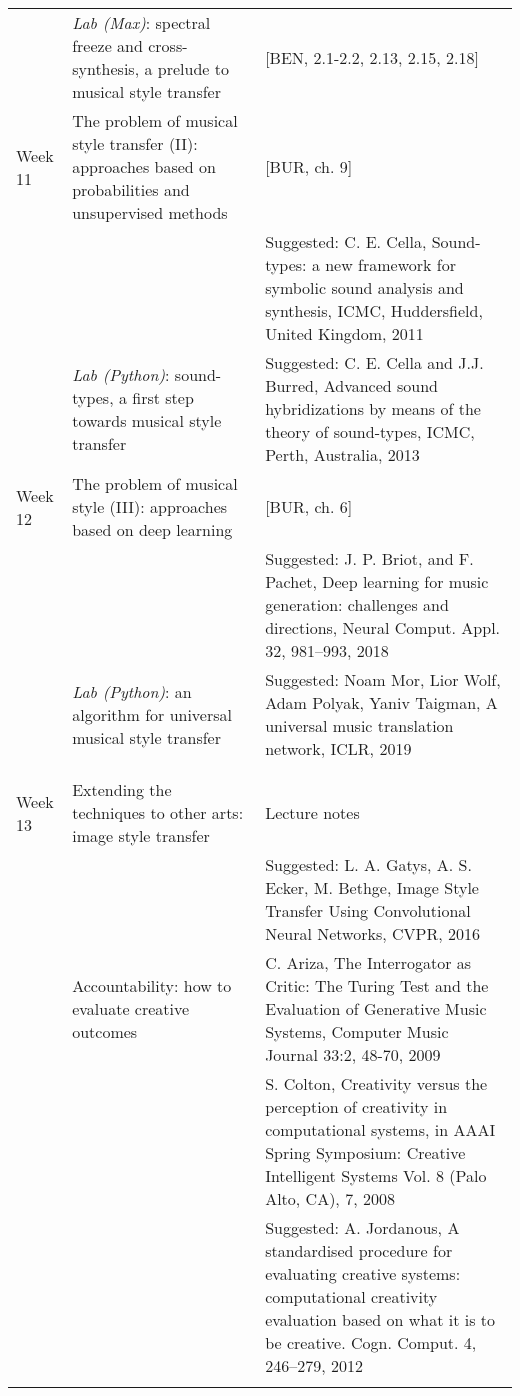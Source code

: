 \documentclass[letterpaper]{inzane_syllabus} %
\begin{document}
\begin{center}
\begin{tabularx}{\textwidth}{p{2cm}p{8cm} @{\hskip 0.5cm} p{9.5cm}}
&   \emph{Lab (Max)}: spectral freeze and cross-synthesis, a prelude to musical style transfer & [BEN, 2.1-2.2, 2.13, 2.15, 2.18] \\
\arrayrulecolor{maingray}\hline

Week 11 & The problem of musical style transfer (II): approaches based on probabilities and unsupervised methods & [BUR, ch. 9] \\

& & Suggested: C. E. Cella, Sound-types: a new framework for symbolic sound analysis and synthesis, ICMC, Huddersfield, United Kingdom, 2011 \\

&\emph{Lab (Python)}: sound-types, a first step towards musical style transfer & Suggested: C. E. Cella and J.J. Burred, Advanced sound hybridizations by means of the theory of sound-types, ICMC, Perth, Australia, 2013 \\

\arrayrulecolor{maingray}\hline
Week 12 & The problem of musical style (III): approaches based on deep learning &  [BUR, ch. 6] \\
& & Suggested: J. P. Briot, and F. Pachet, Deep learning for music generation: challenges and directions, Neural Comput. Appl. 32, 981–993, 2018 \\

&\emph{Lab (Python)}: an algorithm for universal musical style transfer &  Suggested: Noam Mor, Lior Wolf, Adam Polyak, Yaniv Taigman, A universal music translation network, ICLR, 2019 \\
& & \\ 

\arrayrulecolor{myCOLOR}\hline
\multicolumn{2}{l}{\textbf{\textcolor{myCOLOR}{\large MODULE 3: Connections}}} \\
\hline
\arrayrulecolor{maingray}\hline

Week 13 & Extending the techniques to other arts: image style transfer & Lecture notes \\
& & Suggested: L. A. Gatys, A. S. Ecker, M. Bethge, Image Style Transfer Using Convolutional Neural Networks, CVPR, 2016 \\ 
&Accountability: how to evaluate creative outcomes & C. Ariza, The Interrogator as Critic: The Turing Test and the Evaluation of Generative Music Systems, Computer Music Journal 33:2, 48-70, 2009  \\
& & S. Colton, Creativity versus the perception of creativity in computational systems, in AAAI Spring Symposium: Creative Intelligent Systems Vol. 8 (Palo Alto, CA), 7, 2008 \\
& & Suggested: A. Jordanous, A standardised procedure for evaluating creative systems:
computational creativity evaluation based on what it is to be creative. Cogn. Comput. 4, 246–279, 2012 \\
\arrayrulecolor{maingray}\hline


\end{tabularx}
\end{center}
\end{document}
